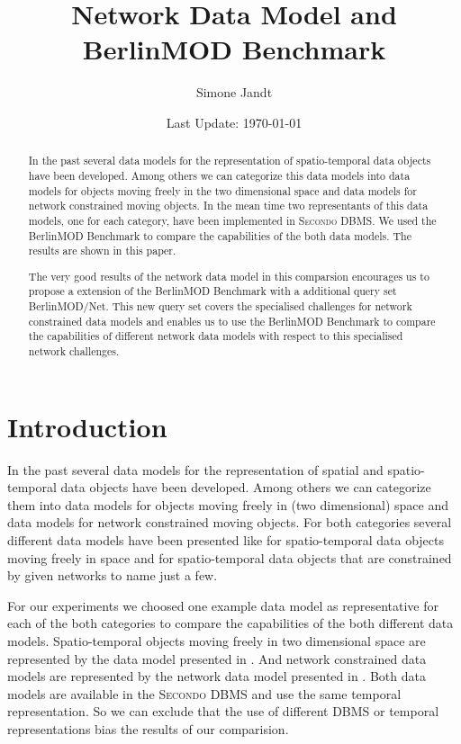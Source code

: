 \documentclass[a4paper]{article}
\title{Network Data Model and BerlinMOD Benchmark}
\author{Simone Jandt}
\date{Last Update: \today}
\newcommand{\secondo}{\textsc{Secondo}}
\newcommand{\bmodb} {BerlinMOD Benchmark}
\begin{document}
\maketitle
\begin{abstract}
In the past several data models for the representation of spatio-temporal data
objects have been developed. Among others we can categorize this data models
into data models for objects moving freely in the two dimensional space and data
models for network constrained moving objects. In the mean time two representants
of this data models, one for each category, have been implemented in
\secondo{} DBMS. We used the \bmodb{} to compare the capabilities of the both
data models. The results are shown in this paper.

The very good results of the network data model in this comparsion encourages us
to propose a extension of the \bmodb{} with a additional query set BerlinMOD/Net.
This new query set covers the specialised challenges for network constrained
data models and enables us to use the \bmodb{} to compare the capabilities of
different network data models with respect to this specialised network challenges.
\end{abstract}
\section{Introduction}
In the past several data models for the representation of spatial and
spatio-temporal data objects have been developed. Among others we can categorize
them into data models for objects moving freely in (two dimensional) space and
data models for network constrained moving objects. For both categories
several different data models have been presented like
\cite{335426,chenzaniolosqlst} for spatio-temporal data objects moving freely in
 space and \cite{1146465,956692,VazWolfNetMod} for spatio-temporal data objects
that are constrained by given networks to name just a few.

For our experiments we choosed one example data model as representative for
each of the both categories to compare the capabilities of the both different
data models. Spatio-temporal objects moving freely in two dimensional space are
represented by the data model presented in \cite{335426}. And network constrained
data models are represented by the network data model presented in \cite{1146465}.
Both data models are available in the \secondo{} DBMS and use the same temporal representation. So we can exclude that the use of different DBMS or temporal
representations bias the results of our comparision.
\end{document}
